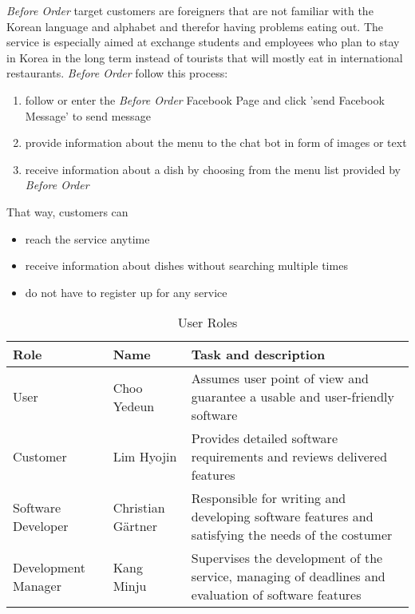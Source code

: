  \emph{Before Order} target customers are foreigners that are not familiar with the Korean language and alphabet and therefor having problems eating out. The service is especially aimed at exchange students and employees who plan to stay in Korea in the long term instead of tourists that will mostly eat in international restaurants. \emph{Before Order} follow this process: 
 
\begin{enumerate}[label=Step \arabic*:, leftmargin=1.5cm]
\item follow or enter the \emph{Before Order} Facebook Page and click 'send Facebook Message' to send message 
\item provide information about the menu to the chat bot in form of images or text
\item receive information about a dish by choosing from the menu list provided by \emph{Before Order}
\end{enumerate}

That way, customers can 
\begin{itemize}
\item reach the service anytime
\item receive information about dishes without searching multiple times
\item do not have to register up for any service 
\end{itemize}

\begin{table}[htb]
\caption{User Roles}
\begin{tabularx}{\linewidth}{|X|X|X|}
\toprule
Role                & Name              & Task and description \\
\midrule
User                & Choo Yedeun       & Assumes user point of view and guarantee a usable and user-friendly software \\
Customer            & Lim Hyojin        & Provides detailed software requirements and reviews delivered features \\
Software Developer  & Christian Gärtner & Responsible for writing and developing software features and satisfying the needs of the costumer    \\
Development Manager & Kang Minju        & Supervises the development of the service, managing of deadlines and evaluation of software features
\end{tabularx}
\end{table}
\FloatBarrier